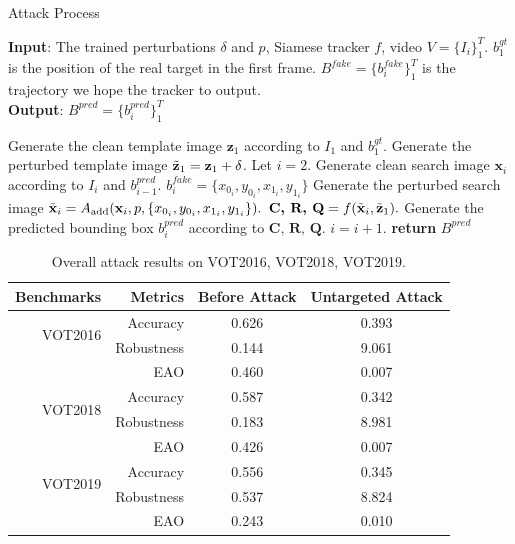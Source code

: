 \documentclass[journal]{IEEEtran}
\begin{document}
\begin{algorithm}[tb]
  \small
  \caption{Attack Process}
  \label{alg:algorithm_attack}
  \textbf{Input}: The trained perturbations $\delta$ and $p$, Siamese tracker $f$, video $V=\{I_i\}_1^T$. $b^{gt}_1$ is the position of the real target in the first frame. $B^{fake}=\{b^{fake}_i\}_1^{T}$ is the trajectory we hope the tracker to output.\\
  \textbf{Output}: $B^{pred}=\{b^{pred}_i\}_1^{T}$
  \begin{algorithmic}[1] %
    \STATE Generate the clean template image $\textbf{z}_1$ according to $I_1$ and $b^{gt}_1$.
    \STATE Generate the perturbed template image $\tilde{\textbf z}_1=\textbf z_1+\delta$.
    \STATE Let $i = 2$.
  \STATE Generate clean search image $\textbf{x}_i$ according to $I_i$ and $b^{pred}_{i-1}$.
  \STATE $b^{fake}_i=\{x_{0_i}, y_{0_i}, x_{1_i}, y_{1_i}\}$
  \STATE Generate the perturbed search image $\tilde{\textbf x}_i = A_{\text{add}}(\textbf x_i, p, \{x_{0_i}, y_{0_i}, x_{1_i}, y_{1_i}\}).$
  \STATE $\textbf{C, R, Q} = f(\tilde {\textbf x}_i, \tilde{\textbf z}_1).$
  \STATE Generate the predicted bounding box $b^{pred}_i$ according to $\textbf{C, R, Q}$.
  \STATE $i = i + 1.$
  \ENDWHILE
  \STATE \textbf{return} $B^{pred}$
  \end{algorithmic}
\end{algorithm}
\begin{table}[t]
  \centering
  \caption{Overall attack results on VOT2016, VOT2018, VOT2019.}
  \begin{tabular}{rrcc}
  \toprule
  Benchmarks & Metrics & Before Attack    & Untargeted Attack  \\
  \midrule
  \multirow{2}{*}[-6pt]{VOT2016} 
  & Accuracy   & 0.626 & 0.393\\
  & Robustness & 0.144 & 9.061\\
  & EAO        & 0.460 & 0.007\\
  \midrule
  \multirow{2}{*}[-6pt]{VOT2018} 
  & Accuracy   & 0.587 & 0.342\\
  & Robustness & 0.183 & 8.981\\
  & EAO        & 0.426 & 0.007\\
  \midrule
  \multirow{2}{*}[-6pt]{VOT2019} 
  & Accuracy   & 0.556 & 0.345\\
  & Robustness & 0.537 & 8.824\\
  & EAO        & 0.243 & 0.010\\
  \bottomrule
  \end{tabular}
  \label{tab:benchmark results1}
\end{table}
\end{document}
